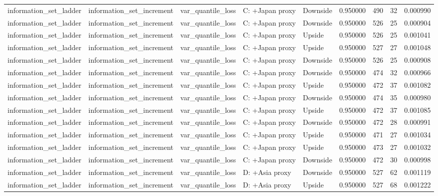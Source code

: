 \begin{tabular}{lllllrrr}
information\_set\_ladder & information\_set\_increment & var\_quantile\_loss & C: +Japan proxy & Downside & 0.950000 & 490 & 32 & 0.000990 \\
information\_set\_ladder & information\_set\_increment & var\_quantile\_loss & C: +Japan proxy & Downside & 0.950000 & 526 & 25 & 0.000904 \\
information\_set\_ladder & information\_set\_increment & var\_quantile\_loss & C: +Japan proxy & Upside & 0.950000 & 526 & 25 & 0.001041 \\
information\_set\_ladder & information\_set\_increment & var\_quantile\_loss & C: +Japan proxy & Upside & 0.950000 & 527 & 27 & 0.001048 \\
information\_set\_ladder & information\_set\_increment & var\_quantile\_loss & C: +Japan proxy & Downside & 0.950000 & 526 & 25 & 0.000908 \\
information\_set\_ladder & information\_set\_increment & var\_quantile\_loss & C: +Japan proxy & Downside & 0.950000 & 474 & 32 & 0.000966 \\
information\_set\_ladder & information\_set\_increment & var\_quantile\_loss & C: +Japan proxy & Upside & 0.950000 & 472 & 37 & 0.001082 \\
information\_set\_ladder & information\_set\_increment & var\_quantile\_loss & C: +Japan proxy & Downside & 0.950000 & 474 & 35 & 0.000980 \\
information\_set\_ladder & information\_set\_increment & var\_quantile\_loss & C: +Japan proxy & Upside & 0.950000 & 472 & 37 & 0.001085 \\
information\_set\_ladder & information\_set\_increment & var\_quantile\_loss & C: +Japan proxy & Downside & 0.950000 & 472 & 28 & 0.000991 \\
information\_set\_ladder & information\_set\_increment & var\_quantile\_loss & C: +Japan proxy & Upside & 0.950000 & 471 & 27 & 0.001034 \\
information\_set\_ladder & information\_set\_increment & var\_quantile\_loss & C: +Japan proxy & Upside & 0.950000 & 473 & 27 & 0.001032 \\
information\_set\_ladder & information\_set\_increment & var\_quantile\_loss & C: +Japan proxy & Downside & 0.950000 & 472 & 30 & 0.000998 \\
information\_set\_ladder & information\_set\_increment & var\_quantile\_loss & D: +Asia proxy & Downside & 0.950000 & 527 & 62 & 0.001119 \\
information\_set\_ladder & information\_set\_increment & var\_quantile\_loss & D: +Asia proxy & Upside & 0.950000 & 527 & 68 & 0.001222 \\

\end{tabular}
